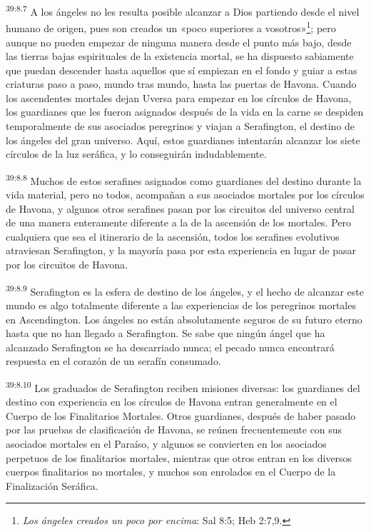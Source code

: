 \par
\textsuperscript{39:8.7} A los ángeles no les resulta posible alcanzar a Dios partiendo desde el nivel humano de origen, pues son creados un «poco superiores a vosotros»\footnote{\textit{Los ángeles creados un poco por encima}: Sal 8:5; Heb 2:7,9.}; pero aunque no pueden empezar de ninguna manera desde el punto más bajo, desde las tierras bajas espirituales de la existencia mortal, se ha dispuesto sabiamente que puedan descender hasta aquellos que sí empiezan en el fondo y guiar a estas criaturas paso a paso, mundo tras mundo, hasta las puertas de Havona. Cuando los ascendentes mortales dejan Uversa para empezar en los círculos de Havona, los guardianes que les fueron asignados después de la vida en la carne se despiden temporalmente de sus asociados peregrinos y viajan a Serafington, el destino de los ángeles del gran universo. Aquí, estos guardianes intentarán alcanzar los siete círculos de la luz seráfica, y lo conseguirán indudablemente.

\par
\textsuperscript{39:8.8} Muchos de estos serafines asignados como guardianes del destino durante la vida material, pero no todos, acompañan a sus asociados mortales por los círculos de Havona, y algunos otros serafines pasan por los circuitos del universo central de una manera enteramente diferente a la de la ascensión de los mortales. Pero cualquiera que sea el itinerario de la ascensión, todos los serafines evolutivos atraviesan Serafington, y la mayoría pasa por esta experiencia en lugar de pasar por los circuitos de Havona.

\par
\textsuperscript{39:8.9} Serafington es la esfera de destino de los ángeles, y el hecho de alcanzar este mundo es algo totalmente diferente a las experiencias de los peregrinos mortales en Ascendington. Los ángeles no están absolutamente seguros de su futuro eterno hasta que no han llegado a Serafington. Se sabe que ningún ángel que ha alcanzado Serafington se ha descarriado nunca; el pecado nunca encontrará respuesta en el corazón de un serafín consumado.

\par
\textsuperscript{39:8.10} Los graduados de Serafington reciben misiones diversas: los guardianes del destino con experiencia en los círculos de Havona entran generalmente en el Cuerpo de los Finalitarios Mortales. Otros guardianes, después de haber pasado por las pruebas de clasificación de Havona, se reúnen frecuentemente con sus asociados mortales en el Paraíso, y algunos se convierten en los asociados perpetuos de los finalitarios mortales, mientras que otros entran en los diversos cuerpos finalitarios no mortales, y muchos son enrolados en el Cuerpo de la Finalización Seráfica.


